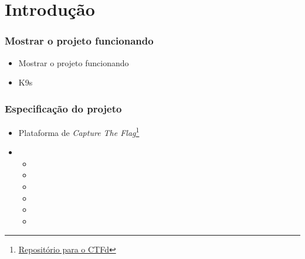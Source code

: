 \section{Introdução}

\begin{frame}
\frametitle{Mostrar o projeto funcionando}
\begin{itemize}
	\item Mostrar o projeto funcionando
	\item K9s
\end{itemize}
\end{frame}

\begin{frame}
\frametitle{Especificação do projeto}
\begin{itemize}
	\item Plataforma de \textit{Capture The Flag}\footnote{\href{https://github.com/CTFd/CTFd}{Repositório para o CTFd}}
	\item {}
		\begin{itemize}
			\item {}
			\item {}
			\item {}
			\item {}
			\item {}
			\item {}
		\end{itemize}
\end{itemize}

\end{frame}

